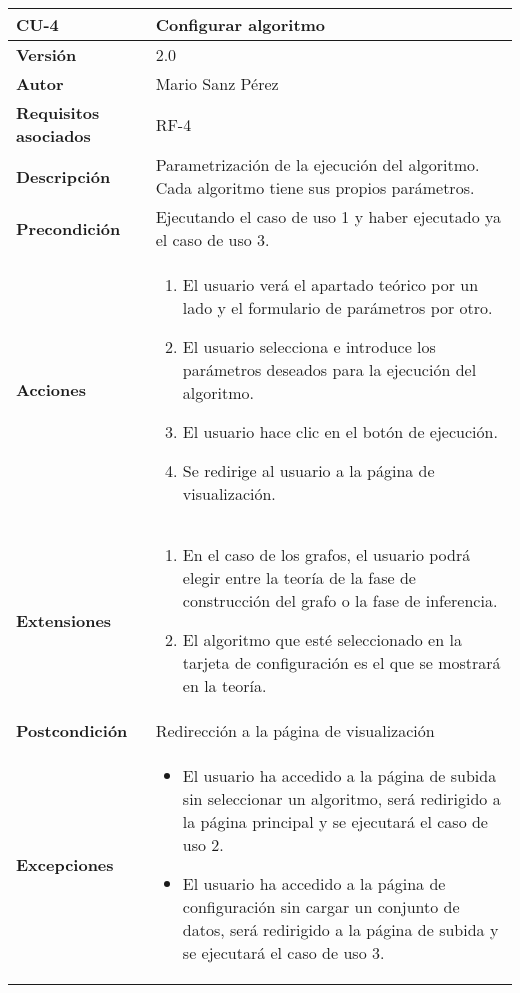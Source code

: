 \begin{table}[p]
	\centering
	\begin{tabularx}{\linewidth}{ p{} p{} }
		\toprule
		\textbf{CU-4}    & \textbf{Configurar algoritmo}\\
		\toprule
		\textbf{Versión}              & 2.0    \\
		\textbf{Autor}                & Mario Sanz Pérez \\
		\textbf{Requisitos asociados} & RF-4 \\
		\textbf{Descripción}          & Parametrización de la ejecución del algoritmo. Cada algoritmo tiene sus propios parámetros. \\
		\textbf{Precondición}         & Ejecutando el caso de uso 1 y haber ejecutado ya el caso de uso 3. \\
		\textbf{Acciones}             &
		\begin{enumerate}
			\def\labelenumi{\arabic{enumi}.}
			\tightlist
			\item El usuario verá el apartado teórico por un lado y el formulario de parámetros por otro.
			\item El usuario selecciona e introduce los parámetros deseados para la ejecución del algoritmo.
			\item El usuario hace clic en el botón de ejecución.
			\item Se redirige al usuario a la página de visualización.
		\end{enumerate}\\
		\textbf{Extensiones}          & 
		\begin{enumerate}[label=\alph*]
			\tightlist
			\item En el caso de los grafos, el usuario podrá elegir entre la teoría de la fase de construcción del grafo o la fase de inferencia.
			\item El algoritmo que esté seleccionado en la tarjeta de configuración es el que se mostrará en la teoría.
		\end{enumerate}\\
		\textbf{Postcondición}        & Redirección a la página de visualización \\
		\textbf{Excepciones}          & \begin{itemize}
			\item El usuario ha accedido a la página de subida sin seleccionar un algoritmo, será redirigido a la página principal y se ejecutará el caso de uso 2.
			\item El usuario ha accedido a la página de configuración sin cargar un conjunto de datos, será redirigido a la página de subida y se ejecutará el caso de uso 3.

\end{itemize}
\end{tabularx}
\end{table}
